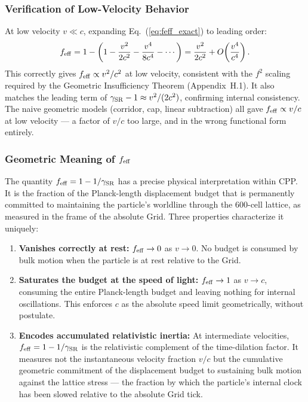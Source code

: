 \documentclass[11pt,letterpaper]{article}
\begin{document}
\subsubsection{Verification of Low-Velocity Behavior}

At low velocity $v \ll c$, expanding Eq.~(\ref{eq:feff_exact}) 
to leading order:
\begin{equation}
f_{\rm eff} = 1 - \left(1 - \frac{v^2}{2c^2} - \frac{v^4}{8c^4} 
- \cdots\right) = \frac{v^2}{2c^2} + O\!\left(\frac{v^4}{c^4}\right).
\label{eq:feff_lowv}
\end{equation}
This correctly gives $f_{\rm eff} \propto v^2/c^2$ at low velocity, consistent with the $f^2$ scaling required by the Geometric Insufficiency Theorem (Appendix~H.1). It also matches the leading term of $\gamma_{\rm SR} - 1 \approx v^2/(2c^2)$, confirming internal consistency. The naive geometric models (corridor, cap, linear subtraction) all gave $f_{\rm eff} \propto v/c$ at low velocity — a factor of $v/c$ too large, and in the wrong functional form entirely.

\subsubsection{Geometric Meaning of $f_{\rm eff}$}

The quantity $f_{\rm eff} = 1 - 1/\gamma_{\rm SR}$ has a precise physical interpretation within CPP. It is the fraction of the Planck-length displacement budget that is permanently committed to maintaining the particle's worldline through the 600-cell lattice, as measured in the frame of the absolute Grid. Three properties characterize it uniquely:

\begin{enumerate}
\item \textbf{Vanishes correctly at rest:} $f_{\rm eff} \to 0$ as $v \to 0$. No budget is consumed by bulk motion when the particle is at rest relative to the Grid.

\item \textbf{Saturates the budget at the speed of light:} 
$f_{\rm eff} \to 1$ as $v \to c$, consuming the entire Planck-length budget and leaving nothing for internal oscillations. This enforces $c$ as the absolute speed limit geometrically, without postulate.

\item \textbf{Encodes accumulated relativistic inertia:} At 
intermediate velocities, $f_{\rm eff} = 1 - 1/\gamma_{\rm SR}$ is the relativistic complement of the time-dilation factor. It measures not the instantaneous velocity fraction $v/c$ but the cumulative geometric commitment of the displacement budget to sustaining bulk motion against the lattice stress — the fraction by which the particle's internal clock has been slowed relative to the absolute Grid tick.
\end{enumerate}
\end{document}

